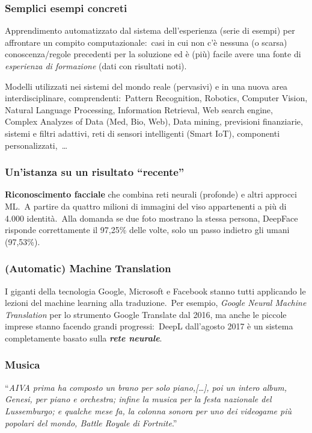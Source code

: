 \subsubsection{Semplici esempi concreti}

Apprendimento automatizzato dal sistema dell'esperienza (serie di esempi) per affrontare un compito computazionale:\ casi in cui non c'è nessuna (o scarsa) conoscenza/regole precedenti per la soluzione ed è (più) facile avere una fonte di \textit{esperienza di formazione} (dati con risultati noti).\

Modelli utilizzati nei sistemi del mondo reale (pervasivi) e in una nuova area interdisciplinare, comprendenti:\ Pattern Recognition, Robotics, Computer Vision, Natural Language Processing, Information Retrieval, Web search engine, Complex Analyzes of Data (Med, Bio, Web), Data mining, previsioni finanziarie, sistemi e filtri adattivi, reti di sensori intelligenti (Smart IoT), componenti personalizzati,\ \dots

\subsubsection{Un'istanza su un risultato ``recente''}
\textbf{Riconoscimento facciale} che combina reti neurali (profonde) e altri approcci ML.\
A partire da quattro milioni di immagini del viso appartenenti a più di 4.000 identità.\
Alla domanda se due foto mostrano la stessa persona, DeepFace risponde correttamente il 97,25\% delle volte, solo un passo indietro gli umani (97,53\%).

\subsubsection{(Automatic) Machine Translation}

I giganti della tecnologia Google, Microsoft e Facebook stanno tutti applicando le lezioni del machine learning alla traduzione.\
Per esempio, \textit{Google Neural Machine Translation} per lo strumento Google Translate dal 2016, ma anche le piccole imprese stanno facendo grandi progressi:\ DeepL dall'agosto 2017 è un sistema completamente basato sulla \textbf{\textit{rete neurale}}.

\subsubsection{Musica}
``\textit{AIVA prima ha composto un brano per solo piano,[\dots], poi un intero album, Genesi, per piano e orchestra; infine la musica per la festa nazionale del Lussemburgo; e qualche mese fa, la colonna sonora per uno dei videogame più popolari del mondo, Battle Royale di Fortnite}.''

